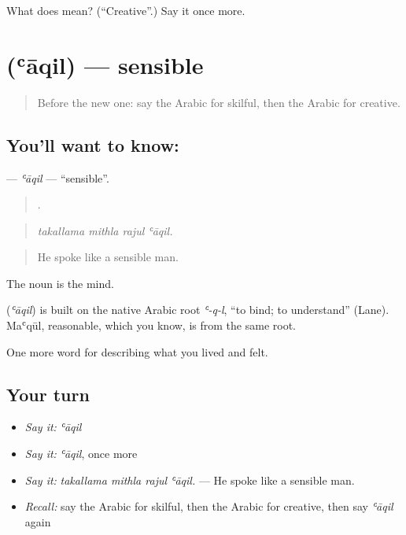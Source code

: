 \begin{tcolorbox}[breakable,colback=teal!4,colframe=teal!35!black,title={Before you move on}]
What does  mean? (\textquotedblleft{}Creative\textquotedblright{}.) Say it once more.
\end{tcolorbox}
\section[\texorpdfstring{\ar{عاقل} (ʿāqil)}{عاقل (ʿāqil)}]{ (ʿāqil) — sensible}

\label{lesson:AR-C501-aqil}



\begin{quote}
Before the new one: say the Arabic for skilful, then the Arabic for creative.
\end{quote}

\subsection*{You'll want to know: }
\textbf{} — \emph{ʿāqil} — \textquotedblleft{}sensible\textquotedblright{}.

\begin{quote}
   .
\end{quote}

\begin{quote}
\emph{takallama mithla rajul ʿāqil.}
\end{quote}

\begin{quote}
He spoke like a sensible man.
\end{quote}

The noun  is the mind.

\begin{cousinweb}
\textbf{} (\emph{ʿāqil}) is built on the native Arabic root \emph{ʿ-q-l}, \textquotedblleft{}to bind; to understand\textquotedblright{} (Lane). Maʿqūl, reasonable, which you know, is from the same root.
\end{cousinweb}

\begin{grammarlens}[title={What you've built}]
One more word for describing what you lived and felt.
\end{grammarlens}

\subsection*{Your turn}
\begin{itemize}
\raggedright
  \item \emph{Say it:} \emph{ʿāqil}
  \item \emph{Say it:} \emph{ʿāqil}, once more
  \item \emph{Say it:} \emph{takallama mithla rajul ʿāqil.} — He spoke like a sensible man.
  \item \emph{Recall:} say the Arabic for skilful, then the Arabic for creative, then say \emph{ʿāqil} again
\end{itemize}


